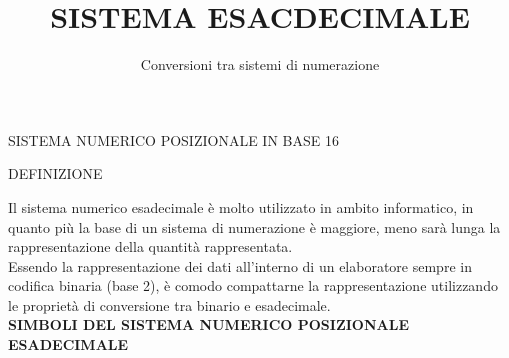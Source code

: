 \documentclass[aspectratio=1610]{beamer}
\title{SISTEMA ESACDECIMALE}
\subtitle{Conversioni tra sistemi di numerazione}
\date{}
\institute{}
\begin{document}
\begin{frame}
    \titlepage
\end{frame}

\begin{frame}{SISTEMA NUMERICO POSIZIONALE IN BASE 16}
    \begin{alertblock}{DEFINIZIONE}
        \begin{minipage}{0.98\linewidth}
            \justifying
            Il sistema numerico esadecimale è molto utilizzato in ambito informatico, in quanto 
            più la base di un sistema di numerazione è maggiore, meno sarà lunga la rappresentazione 
            della quantità rappresentata.\\ 
            \pause
            Essendo la rappresentazione dei dati all'interno di un elaboratore sempre in codifica 
            binaria (base 2), è comodo compattarne la rappresentazione utilizzando le proprietà 
            di conversione tra binario e esadecimale.\\
            \bigskip
            \textbf{SIMBOLI DEL SISTEMA NUMERICO POSIZIONALE ESADECIMALE}\\
            \bigskip
        \end{minipage}
    \end{alertblock}
\end{frame}
\end{document}
